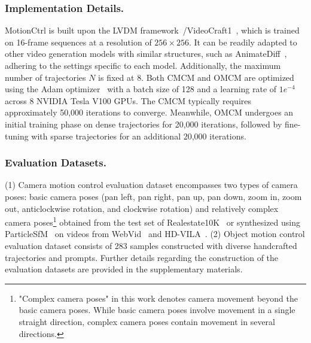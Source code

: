 \documentclass[sigconf]{acmart}
\begin{document}
\subsubsection{Implementation Details.}
MotionCtrl is built upon the LVDM framework~\cite{he2022lvdm}/VideoCraft1~\cite{chen2023videocrafter1}, which is trained on 16-frame sequences at a resolution of $256 \times 256$. It can be readily adapted to other video generation models with similar structures, such as AnimateDiff~\cite{guo2023animatediff}, adhering to the settings specific to each model. Additionally, the maximum number of trajectories $N$ is fixed at 8. Both CMCM and OMCM are optimized using the Adam optimizer~\cite{adam} with a batch size of 128 and a learning rate of $1e^{-4}$ across 8 NVIDIA Tesla V100 GPUs. The CMCM typically requires approximately 50,000 iterations to converge. Meanwhile, OMCM undergoes an initial training phase on dense trajectories for 20,000 iterations, followed by fine-tuning with sparse trajectories for an additional 20,000 iterations.

\subsubsection{Evaluation Datasets.}

(1) Camera motion control evaluation dataset encompasses two types of camera poses: basic camera poses (pan left, pan right, pan up, pan down, zoom in, zoom out, anticlockwise rotation, and clockwise rotation) and relatively complex camera poses\footnote{"Complex camera poses" in this work denotes camera movement beyond the basic camera poses. While basic camera poses involve movement in a single straight direction, complex camera poses contain movement in several directions.} obtained from the test set of Realestate10K~\cite{zhou2018stereo} or synthesized using ParticleSfM~\cite{zhao2022particlesfm} on videos from WebVid~\cite{bain2021frozen} and HD-VILA~\cite{xue2022advancing}. %
(2) Object motion control evaluation dataset consists of 283 samples constructed with diverse handcrafted trajectories and prompts.
%
Further details regarding the construction of the evaluation datasets are provided in the supplementary materials.
\end{document}
